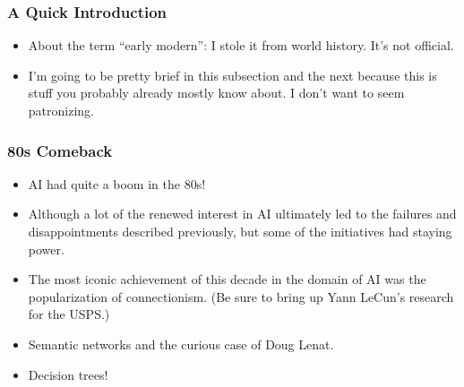 \documentclass[10pt]{beamer}
\begin{document}
  \begin{frame}
    \frametitle{A Quick Introduction}

    \begin{itemize}
      \item About the term ``early modern'': I stole it from world history.
        It's not official.
      \pause
      \item I'm going to be pretty brief in this subsection and the next
        because this is stuff you probably already mostly know about. I don't
        want to seem patronizing.
    \end{itemize}
  \end{frame}

  \begin{frame}
    \frametitle{80s Comeback}

    \begin{itemize}
      \item AI had quite a boom in the 80s!
      \pause
      \item Although a lot of the renewed interest in AI ultimately led to the
        failures and disappointments described previously, but some of the
        initiatives had staying power.
      \pause
      \item The most iconic achievement of this decade in the domain of AI was
        the popularization of connectionism. (Be sure to bring up Yann LeCun's
        research for the USPS.)
      \pause
      \item Semantic networks and the curious case of Doug Lenat.
      \pause
      \item Decision trees!
    \end{itemize}
  \end{frame}
\end{document}
